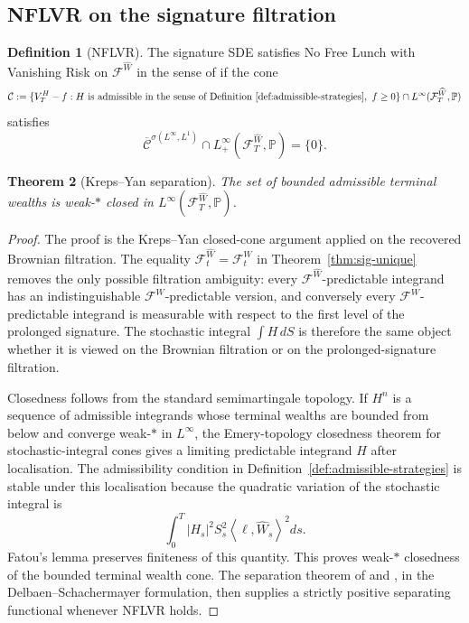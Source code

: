 \documentclass[11pt,oneside]{article}
\theoremstyle{plain}
\newtheorem{theorem}{Theorem}[section]
\theoremstyle{definition}
\newtheorem{definition}[theorem]{Definition}
\theoremstyle{remark}
\newcommand{\Pp}{\mathbb{P}}
\newcommand{\cW}{\widehat W}
\newcommand{\FWh}{\mathcal F^{\widehat W}}
\newcommand{\FW}{\mathcal F^W}
\newcommand{\inner}[2]{\left\langle #1,#2\right\rangle}
\begin{document}
\subsection{NFLVR on the signature filtration}

\begin{definition}[NFLVR]
The signature SDE satisfies No Free Lunch with Vanishing Risk on $\FWh$ in the sense of \citet{DelbaenSchachermayer1994} if the cone
\[
\mathcal C:=\{V_T^H-f: H \text{ is admissible in the sense of Definition~\ref{def:admissible-strategies}},\ f\geq0\}\cap L^\infty(\FWh_T,\Pp)
\]
satisfies
\[
\overline{\mathcal C}^{\sigma(L^\infty,L^1)}\cap L_+^\infty(\FWh_T,\Pp)=\{0\}.
\]
\end{definition}

\begin{theorem}[Kreps--Yan separation]\label{thm:kreps-yan}
The set of bounded admissible terminal wealths is weak-$\ast$ closed in $L^\infty(\FWh_T,\Pp)$.
\end{theorem}

\begin{proof}
The proof is the Kreps--Yan closed-cone argument applied on the recovered Brownian filtration. The equality $\FWh_t=\FW_t$ in Theorem~\ref{thm:sig-unique} removes the only possible filtration ambiguity: every $\FWh$-predictable integrand has an indistinguishable $\FW$-predictable version, and conversely every $\FW$-predictable integrand is measurable with respect to the first level of the prolonged signature. The stochastic integral $\int H\,dS$ is therefore the same object whether it is viewed on the Brownian filtration or on the prolonged-signature filtration.

Closedness follows from the standard semimartingale topology. If $H^n$ is a sequence of admissible integrands whose terminal wealths are bounded from below and converge weak-$\ast$ in $L^\infty$, the Emery-topology closedness theorem for stochastic-integral cones gives a limiting predictable integrand $H$ after localisation. The admissibility condition in Definition~\ref{def:admissible-strategies} is stable under this localisation because the quadratic variation of the stochastic integral is
\[
\int_0^T |H_s|^2S_s^2\inner{\ell}{\cW_s}^2ds.
\]
Fatou's lemma preserves finiteness of this quantity. This proves weak-$\ast$ closedness of the bounded terminal wealth cone. The separation theorem of \citet{Kreps1981} and \citet{Yan1980}, in the Delbaen--Schachermayer formulation, then supplies a strictly positive separating functional whenever NFLVR holds.
\end{proof}
\end{document}
